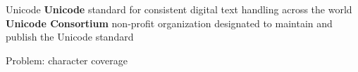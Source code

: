 \documentclass[../index.tex]{subfiles}
\begin{document}
\renewcommand{\currenttitle}{Unicode}
\begin{frame}{\currenttitle}
%
%
  \textbf{Unicode} \textendash{} 
      standard for consistent digital text handling across the world \\[1em]
  \textbf{Unicode Consortium} \textendash{} 
      non-profit organization designated to maintain and publish the Unicode standard
\end{frame}

\renewcommand{\currenttitle}{Problem: character coverage}
\begin{frame}[standout]
%
  Problem: character coverage
\end{frame}
\end{document}

